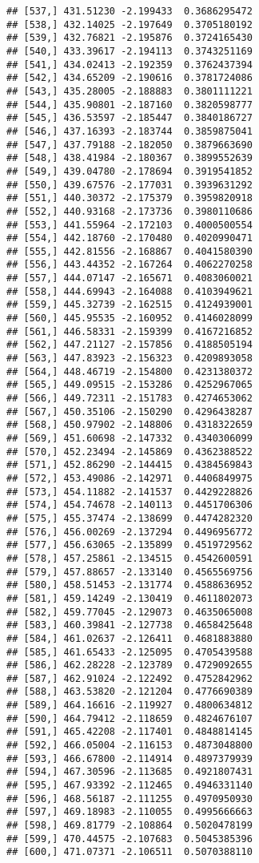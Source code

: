 \documentclass[]{book}
\theoremstyle{definition}
\theoremstyle{definition}
\theoremstyle{definition}
\theoremstyle{remark}
\begin{document}
\begin{verbatim}
## [537,] 431.51230 -2.199433  0.3686295472
## [538,] 432.14025 -2.197649  0.3705180192
## [539,] 432.76821 -2.195876  0.3724165430
## [540,] 433.39617 -2.194113  0.3743251169
## [541,] 434.02413 -2.192359  0.3762437394
## [542,] 434.65209 -2.190616  0.3781724086
## [543,] 435.28005 -2.188883  0.3801111221
## [544,] 435.90801 -2.187160  0.3820598777
## [545,] 436.53597 -2.185447  0.3840186727
## [546,] 437.16393 -2.183744  0.3859875041
## [547,] 437.79188 -2.182050  0.3879663690
## [548,] 438.41984 -2.180367  0.3899552639
## [549,] 439.04780 -2.178694  0.3919541852
## [550,] 439.67576 -2.177031  0.3939631292
## [551,] 440.30372 -2.175379  0.3959820918
## [552,] 440.93168 -2.173736  0.3980110686
## [553,] 441.55964 -2.172103  0.4000500554
## [554,] 442.18760 -2.170480  0.4020990471
## [555,] 442.81556 -2.168867  0.4041580390
## [556,] 443.44352 -2.167264  0.4062270258
## [557,] 444.07147 -2.165671  0.4083060021
## [558,] 444.69943 -2.164088  0.4103949621
## [559,] 445.32739 -2.162515  0.4124939001
## [560,] 445.95535 -2.160952  0.4146028099
## [561,] 446.58331 -2.159399  0.4167216852
## [562,] 447.21127 -2.157856  0.4188505194
## [563,] 447.83923 -2.156323  0.4209893058
## [564,] 448.46719 -2.154800  0.4231380372
## [565,] 449.09515 -2.153286  0.4252967065
## [566,] 449.72311 -2.151783  0.4274653062
## [567,] 450.35106 -2.150290  0.4296438287
## [568,] 450.97902 -2.148806  0.4318322659
## [569,] 451.60698 -2.147332  0.4340306099
## [570,] 452.23494 -2.145869  0.4362388522
## [571,] 452.86290 -2.144415  0.4384569843
## [572,] 453.49086 -2.142971  0.4406849975
## [573,] 454.11882 -2.141537  0.4429228826
## [574,] 454.74678 -2.140113  0.4451706306
## [575,] 455.37474 -2.138699  0.4474282320
## [576,] 456.00269 -2.137294  0.4496956772
## [577,] 456.63065 -2.135899  0.4519729562
## [578,] 457.25861 -2.134515  0.4542600591
## [579,] 457.88657 -2.133140  0.4565569756
## [580,] 458.51453 -2.131774  0.4588636952
## [581,] 459.14249 -2.130419  0.4611802073
## [582,] 459.77045 -2.129073  0.4635065008
## [583,] 460.39841 -2.127738  0.4658425648
## [584,] 461.02637 -2.126411  0.4681883880
## [585,] 461.65433 -2.125095  0.4705439588
## [586,] 462.28228 -2.123789  0.4729092655
## [587,] 462.91024 -2.122492  0.4752842962
## [588,] 463.53820 -2.121204  0.4776690389
## [589,] 464.16616 -2.119927  0.4800634812
## [590,] 464.79412 -2.118659  0.4824676107
## [591,] 465.42208 -2.117401  0.4848814145
## [592,] 466.05004 -2.116153  0.4873048800
## [593,] 466.67800 -2.114914  0.4897379939
## [594,] 467.30596 -2.113685  0.4921807431
## [595,] 467.93392 -2.112465  0.4946331140
## [596,] 468.56187 -2.111255  0.4970950930
## [597,] 469.18983 -2.110055  0.4995666663
## [598,] 469.81779 -2.108864  0.5020478199
## [599,] 470.44575 -2.107683  0.5045385396
## [600,] 471.07371 -2.106511  0.5070388110
\end{verbatim}
\end{document}

